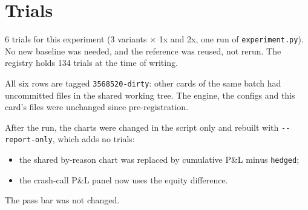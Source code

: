 \documentclass{article}
\begin{document}
\section{Trials}

6 trials for this experiment (3 variants \ensuremath{\times} 1x and 2x, one run of \texttt{experiment.\allowbreak{}py}). No new baseline was needed, and the reference was reused, not rerun. The registry holds 134 trials at the time of writing.

All six rows are tagged \texttt{3568520-\allowbreak{}dirty}: other cards of the same batch had uncommitted files in the shared working tree. The engine, the configs and this card's files were unchanged since pre-registration.

After the run, the charts were changed in the script only and rebuilt with \texttt{-\allowbreak{}-\allowbreak{}report-\allowbreak{}only}, which adds no trials:

\begin{itemize}

\item the shared by-reason chart was replaced by cumulative P\&L minus \texttt{hedged};

\item the crash-call P\&L panel now uses the equity difference.

\end{itemize}

The pass bar was not changed.
\end{document}
